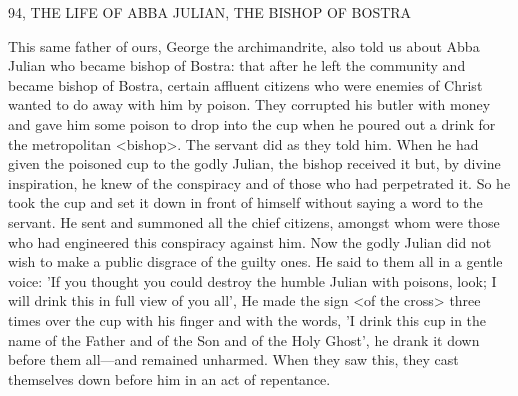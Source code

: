 94, THE LIFE OF ABBA JULIAN, THE
BISHOP OF BOSTRA

This same father of ours, George the archimandrite, also told us
about Abba Julian who became bishop of Bostra: that after he left
the community and became bishop of Bostra, certain affluent
citizens who were enemies of Christ wanted to do away with him by
poison.
They corrupted his butler with money and gave him some
poison to drop into the cup when he poured out a drink for the
metropolitan <bishop>.
The servant did as they told him.
When he
had given the poisoned cup to the godly Julian, the bishop received
it but, by divine inspiration, he knew of the conspiracy and of those
who had perpetrated it.
So he took the cup and set it down in front
of himself without saying a word to the servant.
He sent and
summoned all the chief citizens, amongst whom were those who had
engineered this conspiracy against him.
Now the godly Julian did
not wish to make a public disgrace of the guilty ones.
He said to
them all in a gentle voice: 'If you thought you could destroy the
humble Julian with poisons, look; I will drink this in full view of
you all', He made the sign <of the cross> three times over the cup
with his finger and with the words, 'I drink this cup in the name of
the Father and of the Son and of the Holy Ghost', he drank it
down before them all—and remained unharmed.
When they saw
this, they cast themselves down before him in an act of repentance.


